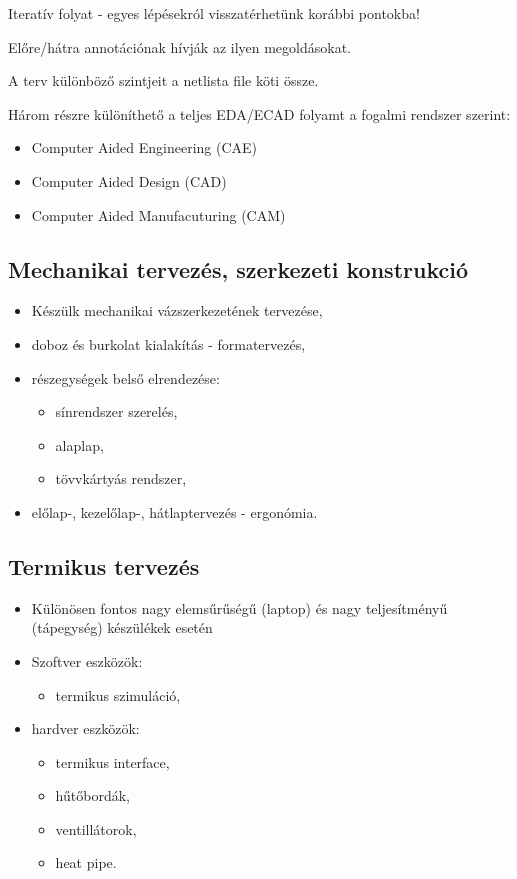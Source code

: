 \documentclass[11pt]{article}
\begin{document}
			Iteratív folyat - egyes lépésekról visszatérhetünk korábbi pontokba! 
			
			Előre/hátra annotációnak hívják az ilyen megoldásokat.

			A terv különböző szintjeit a netlista file köti össze.

			Három részre különíthető a teljes EDA/ECAD folyamt a fogalmi rendszer szerint:

			\begin{itemize}
				\item Computer Aided Engineering (CAE)
				\item Computer Aided Design (CAD)
				\item Computer Aided Manufacuturing (CAM)
			\end{itemize}

		\subsection{Mechanikai tervezés, szerkezeti konstrukció}

			\begin{itemize}
				\item Készülk mechanikai vázszerkezetének tervezése,
				\item doboz és burkolat kialakítás - formatervezés,
				\item részegységek belső elrendezése:
				\begin{itemize}
					\item sínrendszer szerelés,
					\item alaplap,
					\item tövvkártyás rendszer,
				\end{itemize}
				\item előlap-, kezelőlap-, hátlaptervezés - ergonómia.
			\end{itemize}

		\subsection{Termikus tervezés}

			\begin{itemize}
				\item Különösen fontos nagy elemsűrűségű (laptop) és nagy teljesítményű (tápegység) készülékek esetén
				\item Szoftver eszközök:
				\begin{itemize}
					\item termikus szimuláció,
				\end{itemize}
				\item hardver eszközök:
				\begin{itemize}
					\item termikus interface,
					\item hűtőbordák,
					\item ventillátorok,
					\item heat pipe.
				\end{itemize}
			\end{itemize}
\end{document}
